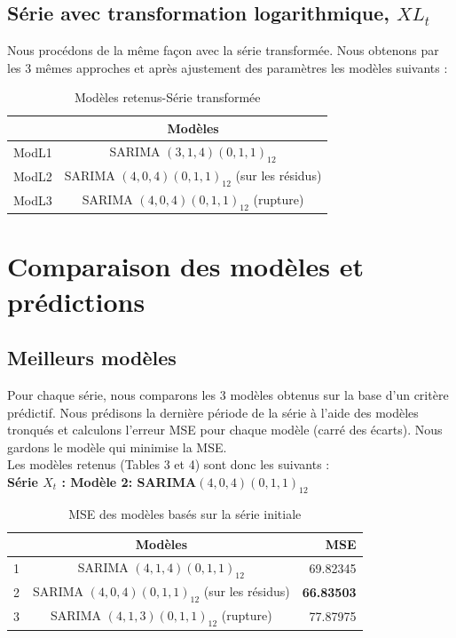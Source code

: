 \documentclass[12pt,a4paper]{book}
\newcommand{\1}{\mathds{1}}
\begin{document}
\vspace{20 mm}
\subsection{Série avec transformation logarithmique, $XL_t$}

Nous procédons de la même façon avec la série transformée. Nous obtenons par les 3 mêmes approches et après ajustement des paramètres les modèles suivants : 

\begin{table}[h!]
  \begin{center}
    \caption{Modèles retenus-Série transformée}
    \label{tab:table1}
    \begin{tabular}{l|c}
      \ & \textbf{Modèles}\\
      \hline
      ModL1 & SARIMA $(3,1,4)(0,1,1)_{12}$\\
      ModL2& SARIMA $(4,0,4)(0,1,1)_{12}$ (sur les résidus)\\
      ModL3 & SARIMA $(4,0,4)(0,1,1)_{12}$ (rupture)\\
    \end{tabular}
  \end{center}
\end{table}

\vspace{5 mm}
\section{Comparaison des modèles et prédictions}

\subsection{Meilleurs modèles}

Pour chaque série, nous comparons les 3 modèles obtenus sur la base d'un critère prédictif. Nous prédisons la dernière période de la série à l'aide des modèles tronqués et calculons l'erreur MSE pour chaque modèle (carré des écarts). Nous gardons le modèle qui minimise la MSE.\\
Les modèles retenus (Tables 3 et 4) sont donc les suivants : \\

\noindent
\textbf{Série $X_t$ : Modèle 2: SARIMA$(4,0,4)(0,1,1)_{12}$}

\begin{table}[h!]
  \begin{center}
    \caption{MSE des modèles basés sur la série initiale}
    \label{tab:table1}
    \begin{tabular}{l|c|r} 
      \ & \textbf{Modèles} & \textbf{MSE}\\
      \hline
      1 & SARIMA $(4,1,4)(0,1,1)_{12}$ & 69.82345\\
      \rowcolor{LightCyan}
      2 & SARIMA $(4,0,4)(0,1,1)_{12}$ (sur les résidus)& \textbf{66.83503}\\
      3 & SARIMA $(4,1,3)(0,1,1)_{12}$ (rupture) & 77.87975\\
    \end{tabular}
  \end{center}
\end{table}
\end{document}
